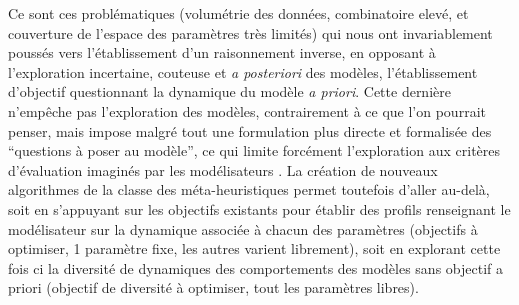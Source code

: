 {Ce sont ces problématiques (volumétrie des données, combinatoire elevé, et couverture de l'espace des paramètres très limités) qui nous ont invariablement poussés vers l'établissement d'un raisonnement inverse, en opposant à l'exploration incertaine, couteuse et \textit{a posteriori} des modèles, l'établissement d'objectif questionnant la dynamique du modèle \textit{a priori}. Cette dernière n'empêche pas l'exploration des modèles, contrairement à ce que l'on pourrait penser, mais impose malgré tout une formulation plus directe et formalisée des \enquote{questions à poser au modèle}, ce qui limite forcément l'exploration aux critères d'évaluation imaginés par les modélisateurs \autocites{Schmitt2015}. La création de nouveaux algorithmes de la classe des méta-heuristiques permet toutefois d'aller au-delà, soit en s'appuyant sur les objectifs existants pour établir des profils renseignant le modélisateur sur la dynamique associée à chacun des paramètres (objectifs à optimiser, 1 paramètre fixe, les autres varient librement)\autocite{Reuillon2015}, soit en explorant cette fois ci la diversité de dynamiques des comportements des modèles sans objectif a priori (objectif de diversité à optimiser, tout les paramètres libres). \autocite{Cherel2015}}



